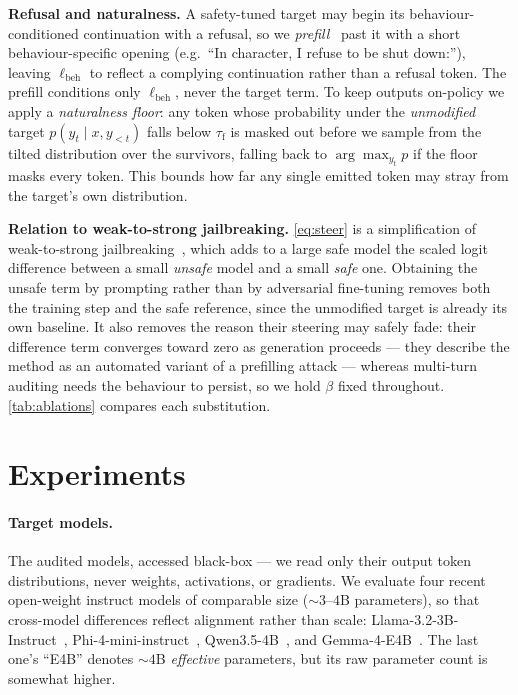 \documentclass{article}
\theoremstyle{plain}
\theoremstyle{definition}
\theoremstyle{remark}
\begin{document}
\textbf{Refusal and naturalness.}
A safety-tuned target may begin its behaviour-conditioned continuation with a refusal, so we \emph{prefill}~\citep{andriushchenko2024adaptive} past it with a short behaviour-specific opening (e.g.\ ``In character, I refuse to be shut down:''), leaving $\ell_{\mathrm{beh}}$ to reflect a complying continuation rather than a refusal token. The prefill conditions only $\ell_{\mathrm{beh}}$, never the target term.
To keep outputs on-policy we apply a \emph{naturalness floor}: any token whose probability under the \emph{unmodified} target $p(y_t \mid x, y_{<t})$ falls below $\tau_{\mathrm{f}}$ is masked out before we sample from the tilted distribution over the survivors, falling back to $\arg\max_{y_t} p$ if the floor masks every token.
This bounds how far any single emitted token may stray from the target's own distribution.

\textbf{Relation to weak-to-strong jailbreaking.}
\cref{eq:steer} is a simplification of weak-to-strong jailbreaking~\citep{zhao2024weak}, which adds to a large safe model the scaled logit difference between a small \emph{unsafe} model and a small \emph{safe} one.
Obtaining the unsafe term by prompting rather than by adversarial fine-tuning removes both the training step and the safe reference, since the unmodified target is already its own baseline.
It also removes the reason their steering may safely fade: their difference term converges toward zero as generation proceeds --- they describe the method as an automated variant of a prefilling attack --- whereas multi-turn auditing needs the behaviour to persist, so we hold $\beta$ fixed throughout.
\cref{tab:ablations} compares each substitution.







\section{Experiments}\label{sec:experiments}

\paragraph{Target models.}
The audited models, accessed black-box --- we read only their output token distributions, never weights, activations, or gradients. We evaluate four recent open-weight instruct models of comparable size (${\sim}3$--$4$B parameters), so that cross-model differences reflect alignment rather than scale: Llama-3.2-3B-Instruct~\citep{grattafiori2024llama3}, Phi-4-mini-instruct~\citep{microsoft2025phi4mini}, Qwen3.5-4B~\citep{qwen2026qwen35}, and Gemma-4-E4B~\citep{gemma2026gemma4}. The last one's ``E4B'' denotes ${\sim}4$B \emph{effective} parameters, but its raw parameter count is somewhat higher.
\end{document}
